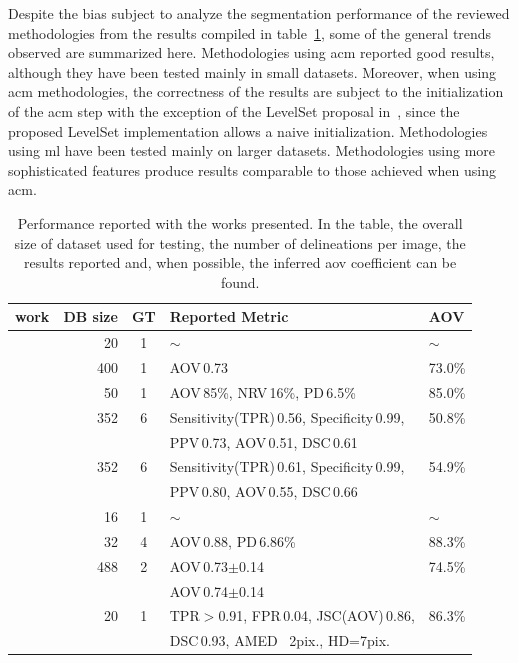 \documentclass[authoryear,preprint,review,12pt]{elsarticle}
\begin{document}
Despite the bias subject to analyze the segmentation performance of the reviewed methodologies from the results compiled in table~\ref{table:segmentationperformance}, some of the general trends observed are summarized here. Methodologies using \ac{acm} reported good results, although they have been tested mainly in small datasets.
Moreover, when using \ac{acm} methodologies, the correctness of the results are subject to the initialization of the \ac{acm} step with the exception of the LevelSet proposal in~\cite{Liu:2010p14328}, since the proposed LevelSet implementation allows a naive initialization. Methodologies using \ac{ml} have been tested mainly on larger datasets. Methodologies using more sophisticated features produce results comparable to those achieved when using \ac{acm}. 


\begin{table}
\caption[Reported performance of the segmentation methodologies reviewed]{Performance reported with the works presented. In the table, the overall size of dataset used for testing, the number of delineations per image, the results reported and, when possible, the inferred \acf{aov} coefficient can be found. }
\begin{tiny}
\label{table:segmentationperformance}
\begin{tabular}{rrcll}


work & {\scriptsize DB size} & GT & Reported Metric & AOV \\ \hline \hline

\cite{Angelova:2010p14355}& 20 & 1 &$\sim$ & $\sim$ \\
\hline
\rowcolor[gray]{.9} \cite{Horsch:2001p6028}& 400 & 1 & AOV\,0.73 & 73.0\%\\
\cite{Gomez:2010p14339}&50&1&AOV\,85\%, NRV\,16\%, PD\,6.5\%& 85.0\%\\
\rowcolor[gray]{.9} \cite{Xiao:2002p5639,gerard2013}&352&6&Sensitivity(TPR)\,0.56, Specificity\,0.99, & 50.8\%\\ \rowcolor[gray]{.9} & & & PPV\,0.73, AOV\,0.51, DSC\,0.61&\\
\rowcolor[gray]{.9} \cite{gerard2013} &352&6&Sensitivity(TPR)\,0.61, Specificity\,0.99, & 54.9\%\\ \rowcolor[gray]{.9} & & & PPV\,0.80, AOV\,0.55, DSC\,0.66&\\
\cite{chiang2010cell}&16&1&$\sim$&$\sim$\\
\rowcolor[gray]{.9} \cite{AlemanFlores:2007p14310}&32&4&AOV\,0.88, PD\,6.86\%&88.3\%\\ \cite{Cui:2009p14325}&488&2&AOV\,0.73$\pm$0.14 & 74.5\%\\ &&&  AOV\,0.74$\pm$0.14&\\
\rowcolor[gray]{.9} \cite{Gao:2012p14336}&20&1&TPR$>$0.91, FPR\,0.04, JSC(AOV)\,0.86, & 86.3\%\\ \rowcolor[gray]{.9} &&& DSC\,0.93, AMED ~2pix., HD=7pix.&\\


\end{tabular}
\end{tiny}
\end{table}
\end{document}
